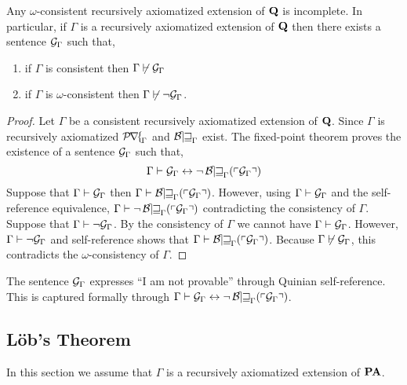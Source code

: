 \documentclass[12pt]{article}
\begin{document}
\begin{theorem}[G\"{o}del]
Any $\omega$-consistent recursively axiomatized extension of $\bf{Q}$ is incomplete. In particular, if $\Gamma$ is a recursively axiomatized extension of $\bf{Q}$ then there exists a sentence $\G{\Gamma}$ such that,
\begin{enumerate}
\item if $\Gamma$ is consistent then $\Gamma \not\proves \G{\Gamma}$
\item if $\Gamma$ is $\omega$-consistent then $\Gamma \not\proves \neg \G{\Gamma}$.
\end{enumerate}
\end{theorem}

\begin{proof}
Let $\Gamma$ be a consistent recursively axiomatized extension of $\bf{Q}$. Since $\Gamma$ is recursively axiomatized $\Prf_{\Gamma}$ and $\Bew_{\Gamma}$ exist. The fixed-point theorem proves the existence of a sentence $\G{\Gamma}$ such that,
\[ \Gamma \proves \G{\Gamma} \leftrightarrow \neg \Thm{\G{\Gamma}} \]
Suppose that $\Gamma \proves \G{\Gamma}$ then $\Gamma \proves \Thm{\G{\Gamma}}$. However, using $\Gamma \proves \G{\Gamma}$ and the self-reference equivalence, $\Gamma \proves \neg \Thm{\G{\Gamma}}$ contradicting the consistency of $\Gamma$. 
\bigskip\\
Suppose that $\Gamma \proves \neg \G{\Gamma}$. By the consistency of $\Gamma$ we cannot have $\Gamma \proves \G{\Gamma}$. However, $\Gamma \proves \neg \G{\Gamma}$ and self-reference shows that $\Gamma \proves \Thm{\G{\Gamma}}$. Because $\Gamma \not\proves \G{\Gamma}$, this contradicts the $\omega$-consistency of $\Gamma$.
\end{proof}

\begin{remark}
The sentence $\G{\Gamma}$ expresses ``I am not provable'' through Quinian self-reference. This is captured formally through $\Gamma \proves \G{\Gamma} \leftrightarrow \neg \Thm{\G{\Gamma}}$.
\end{remark}


\subsection{L\"{o}b's Theorem}

\begin{remark}
In this section we assume that $\Gamma$ is a recursively axiomatized extension of $\bf{PA}$. 
\end{remark}
\end{document}
